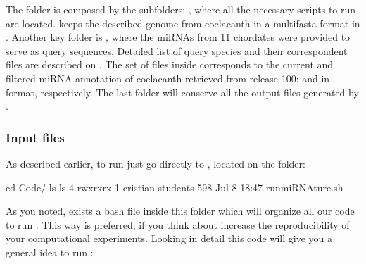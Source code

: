 \documentclass[letterpaper,10pt,english]{sphinxmanual}
\begin{document}
The  folder is composed by the subfolders: , where all the
necessary scripts to run  are located.  keeps the
described genome from coelacanth in a multi\sphinxhyphen{}fasta format in
. Another key folder is ,
where the miRNAs from 11 chordates were provided to serve as query sequences.
Detailed list of query species and their correspondent files are described on
. The set of files inside 
corresponds to the current and filtered miRNA annotation of coelacanth retrieved
from  release 100:  and
 in  format, respectively. The last
 folder will conserve all the output files generated by
.


\subsubsection{Input files}
\label{\detokenize{tutorial:input-files}}
As described earlier, to run  just go directly to , located
on the  folder:

\begin{sphinxVerbatim}[commandchars=\\\{\}]
\PYGZdl{} cd Code/
\PYGZdl{} ls \PYGZhy{}ls
4 \PYGZhy{}rwxr\PYGZhy{}xr\PYGZhy{}x 1 cristian students 598 Jul  8 18:47 run\PYGZus{}miRNAture.sh
\end{sphinxVerbatim}

As you noted, exists a bash file inside this folder which will organize all our
code to run . This way is preferred, if you think about increase
the reproducibility of your computational experiments. Looking in detail this code will give
you a general idea to run :
\end{document}
